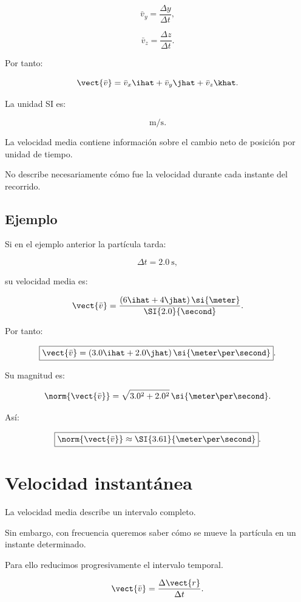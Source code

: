 \[
\boxed{
\bar{v}_y
=
\frac{\Delta y}{\Delta t}
},
\]

\[
\boxed{
\bar{v}_z
=
\frac{\Delta z}{\Delta t}
}.
\]

Por tanto:

\[
\vect{\bar{v}}
=
\bar{v}_x\ihat
+
\bar{v}_y\jhat
+
\bar{v}_z\khat.
\]

La unidad SI es:

\[
\si{\meter\per\second}.
\]

\begin{interpretacion}
La velocidad media contiene información sobre el cambio neto de posición por
unidad de tiempo.

No describe necesariamente cómo fue la velocidad durante cada instante del
recorrido.
\end{interpretacion}


\subsection{Ejemplo}

Si en el ejemplo anterior la partícula tarda:

\[
\Delta t=\SI{2.0}{\second},
\]

su velocidad media es:

\[
\vect{\bar{v}}
=
\frac{
(6\ihat+4\jhat)\,\si{\meter}
}{
\SI{2.0}{\second}
}.
\]

Por tanto:

\[
\boxed{
\vect{\bar{v}}
=
(3.0\ihat+2.0\jhat)\,
\si{\meter\per\second}
}.
\]

Su magnitud es:

\[
\norm{\vect{\bar{v}}}
=
\sqrt{3.0^2+2.0^2}\,
\si{\meter\per\second}.
\]

Así:

\[
\boxed{
\norm{\vect{\bar{v}}}
\approx
\SI{3.61}{\meter\per\second}
}.
\]


\section{Velocidad instantánea}

La velocidad media describe un intervalo completo.

Sin embargo, con frecuencia queremos saber cómo se mueve la partícula en un
instante determinado.

Para ello reducimos progresivamente el intervalo temporal.

\[
\vect{\bar{v}}
=
\frac{\Delta\vect{r}}{\Delta t}.
\]


